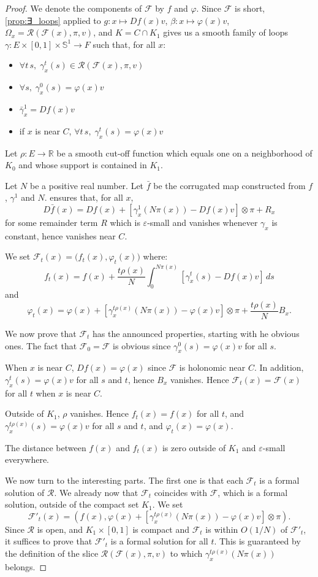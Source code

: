 \documentclass[10pt,a4paper]{article}
\newcommand{\co}{\!:}
\newcommand{\Rel}{\mathcal{R}} %
\newcommand{\bigO}[1]{O\left(#1\right)}
\newcommand{\F}{\mathcal{F}} %
\newcommand{\uses}[1]{}
\newcommand{\proves}[1]{}
\newcommand{\leanok}{}
\begin{document}
\begin{proof}
  \leanok
  \proves{lem:integration_step}
  \uses{prop:∃_loops, prop:theilliere, lem:update_lin_map}
  We denote the components of $\F$ by $f$ and $φ$.
  Since $\F$ is short, \cref{prop:∃_loops} applied to
  $g \co x ↦ Df(x)v$, $β \co x ↦ φ(x)v$,
  $Ω_x = \Rel(\F(x), π, v)$, and $K = C ∩ K_1$ gives us a smooth family of loops
  $γ \co E × [0, 1] × 𝕊^1 → F$ such that, for all $x$:
  \begin{itemize}
    \item $∀ t\, s,\; γ^t_x(s) ∈ \Rel(\F(x), π, v)$
    \item $∀ s,\; γ^0_x(s) = φ(x)v$
    \item $\bar γ^1_x = Df(x)v$
    \item if $x$ is near $C$, $∀t\, s,\; γ^t_x(s) = φ(x)v$
  \end{itemize}
  Let $ρ: E → ℝ$ be a smooth cut-off function which equals one on
  a neighborhood of $K_0$ and whose support is contained in $K_1$.

  Let $N$ be a positive real number.
  Let $\bar f$ be the corrugated map constructed from $f$, $γ^1$ and $N$.
   ensures that, for all $x$,
  \[
    D\bar f(x) = Df(x) + \left[γ^1_x(Nπ(x)) - Df(x)v\right] ⊗ π +
             R_x
  \]
  for some remainder term $R$ which is $ε$-small and vanishes whenever $γ_x$ is
  constant, hence vanishes near $C$.

  We set $\F_t(x) = \big(f_t(x), φ_t(x)\big)$ where:
  \[
    f_t(x) = f(x) + \frac{tρ(x)}N \int_0^{Nπ(x)}
                    \left[γ^t_x(s) - Df(x)v\right]\, ds
  \]
  and
  \[
    φ_t(x) = φ(x) + \left[γ^{tρ(x)}_x(Nπ(x)) - φ(x)v\right] ⊗ π +
            \frac{tρ(x)}N B_x.
  \]

  We now prove that $\F_t$ has the announced properties, starting with
  he obvious ones.
  The fact that $\F_0 = \F$ is obvious since $γ^0_x(s) = φ(x)v$ for all
  $s$.

  When $x$ is near $C$, $Df(x) = φ(x)$ since $\F$ is holonomic near
  $C$.
  In addition, $γ^t_x(s) = φ(x)v$ for all $s$ and $t$, hence $B_x$ vanishes.
  Hence $\F_t(x) = \F(x)$ for all $t$ when $x$ is near $C$.

  Outside of $K_1$, $ρ$ vanishes. Hence $f_t(x) = f(x)$ for all $t$,
  and $γ^{tρ(x)}_x(s) = φ(x)v$ for all $s$ and $t$, and $φ_t(x) = φ(x)$.

  The distance between $f(x)$ and $f_t(x)$ is zero outside of $K_1$
  and $ε$-small everywhere.

  We now turn to the interesting parts.
  The first one is that each $\F_t$ is a formal solution of $\Rel$.
  We already now that $\F_t$ coincides with $\F$, which is a formal
  solution, outside of the compact set $K_1$.
  We set
  \[
    \F'_t(x) = \left(f(x),
                     φ(x) + \left[γ^{tρ(x)}_x(Nπ(x)) - φ(x)v\right] ⊗ π\right).
  \]
  Since $\Rel$ is open, and $K_1 × [0, 1]$ is compact and $\F_t$ is
  within $\bigO{1/N}$ of $\F'_t$, it suffices to prove that $\F'_t$ is a formal
  solution for all $t$.
  This is guaranteed by the definition of the slice $\Rel(\F(x), π, v)$
  to which $γ^{tρ(x)}_x(Nπ(x))$ belongs.


\end{proof}
\end{document}
